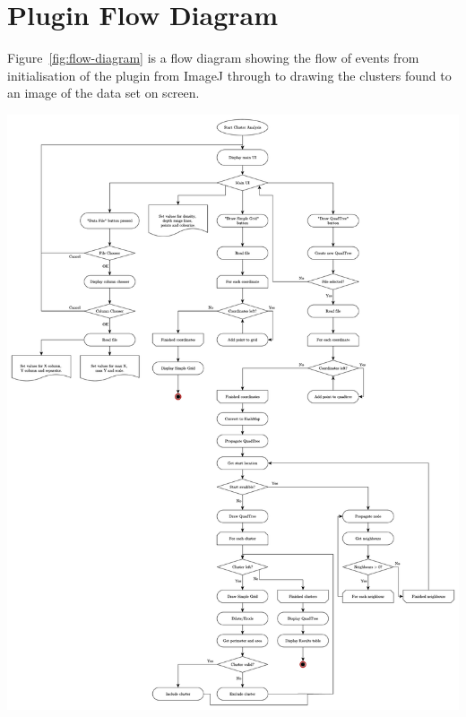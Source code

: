 
\section{Plugin Flow Diagram}
\label{sec:flow_diagram}

Figure~\ref{fig:flow-diagram} is a flow diagram showing the flow of events from
initialisation of the plugin from ImageJ through to drawing the clusters found
to an image of the data set on screen.

\includegraphics[height=0.87\textheight]{flow-chart.pdf}\label{fig:flow-diagram}
